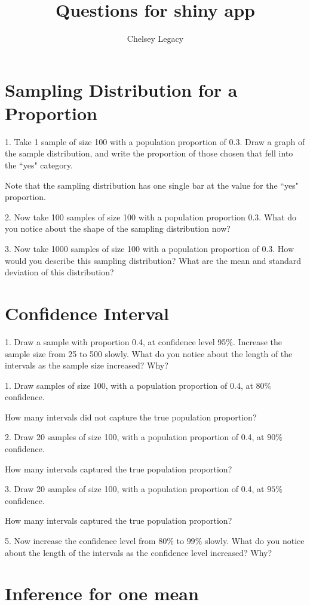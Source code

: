 \documentclass[11pt]{amsart}
\title{Questions for shiny app}
\author{Chelsey Legacy}
\begin{document}
\maketitle
\section{Sampling Distribution for a Proportion}
1.  Take 1 sample of size 100 with a population proportion of 0.3. Draw a graph of the sample distribution, and write the proportion of those chosen that fell into the ``yes" category. 


Note that the sampling distribution has one single bar at the value for the ``yes" proportion.

2.  Now take 100 samples of size 100 with a population proportion 0.3.  What do you notice about the shape of the sampling distribution now?

3. Now take 1000 samples of size 100 with a population proportion of 0.3.  How would you describe this sampling distribution? What are the mean and standard deviation of this distribution?


\section{Confidence Interval}

1. Draw a sample with proportion 0.4, at confidence level 95$\%$. Increase the sample size from 25 to 500 slowly. What do you notice about the length of the intervals as the sample size increased? Why?

1. Draw samples of size 100, with a population proportion of 0.4, at $80\%$ confidence.

 
 How many intervals did not capture the true population proportion?
 
 2. Draw 20 samples of size 100, with a population proportion of 0.4, at $90\%$ confidence.


 How many intervals captured the true population proportion?
 
 3. Draw 20 samples of size 100, with a population proportion of 0.4, at $95\%$ confidence.


 How many intervals captured the true population proportion?


5. Now increase the confidence level from $80\%$ to $99\%$ slowly. What do you notice about the length of the intervals as the confidence level increased? Why?




\section{Inference for one mean}
\end{document}
